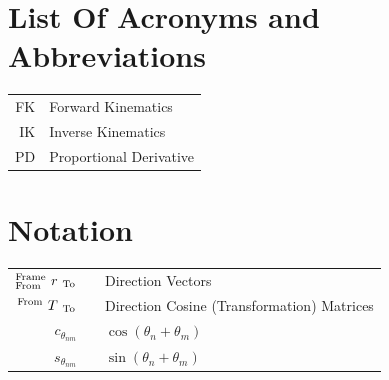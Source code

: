 \documentclass[12pt]{report}
\begin{document}
\normalem

{\tableofcontents\let\clearpage\relax\listoffigures\let\clearpage\relax}
\clearpage
\newpage

\section*{List Of Acronyms and Abbreviations}
\begin{tabular}{rl}
  FK & Forward Kinematics \\
  IK & Inverse Kinematics  \\
  PD & Proportional Derivative \\
\end{tabular}

\section*{Notation}\vspace{-\baselineskip}
\renewcommand{\arraystretch}{2.25}
\begin{tabular}{rcl}
\large%
\(
{}^{\text{\scriptsize Frame}}_{\text{\scriptsize From}}~{r}~_{\text{\scriptsize To}}
\)\normalsize && Direction Vectors\\
\(
{}^{\text{\scriptsize From}}~{T}~_{\text{\scriptsize To}}
\)\normalsize && Direction Cosine (Transformation) Matrices \\
\(c_{\theta_{nm}}\)& & \( \cos(\theta_n + \theta_m)\)\\
\(s_{\theta_{nm}}\)& & \( \sin(\theta_n + \theta_m)\) \\
\end{tabular}
\renewcommand{\arraystretch}{1}
\newpage
\end{document}
